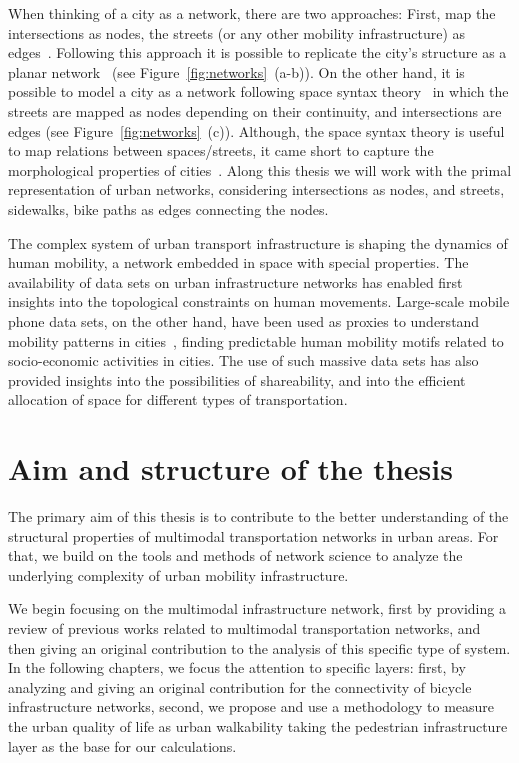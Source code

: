 When thinking of a city as a network, there are two approaches: First, map the intersections as nodes, the streets (or any other mobility infrastructure) as edges~\cite{porta2006primal}. Following this approach it is possible to replicate the city's structure as a planar network~\cite{Boeing2020Planarity} (see Figure~\ref{fig:networks}~(a-b)). On the other hand, it is possible to model a city as a network following space syntax theory~\cite{hillier1976syntax} in which the streets are mapped as nodes depending on their continuity, and intersections are edges (see Figure~\ref{fig:networks}~(c)). Although, the space syntax theory is useful to map relations between spaces/streets, it came short to capture the morphological properties of cities~\cite{batty2004new}. Along this thesis we will work with the primal representation of urban networks, considering intersections as nodes, and streets, sidewalks, bike paths as edges connecting the nodes.


The complex system of urban transport infrastructure is shaping the dynamics of human mobility, a network embedded in space with special properties. The availability of data sets on urban infrastructure networks has enabled first insights into the topological constraints on human movements. Large-scale mobile phone data sets, on the other hand, have been used as proxies to understand mobility patterns in cities~\cite{gonzalez2008understanding}, finding predictable human mobility motifs related to socio-economic activities in cities. The use of such massive data sets has also provided insights into the possibilities of shareability, and into the efficient allocation of space for different types of transportation.


\section{Aim and structure of the thesis}

The primary aim of this thesis is to contribute to the better understanding of the structural properties of multimodal transportation networks in urban areas. For that, we build on the tools and methods of network science to analyze the underlying complexity of urban mobility infrastructure. 

We begin focusing on the multimodal infrastructure network, first by providing a review of previous works related to multimodal transportation networks, and then giving an original contribution to the analysis of this specific type of system. In the following chapters, we focus the attention to specific layers: first, by analyzing and giving an original contribution for the connectivity of bicycle infrastructure networks, second, we propose and use a methodology to measure the urban quality of life as urban walkability taking the pedestrian infrastructure layer as the base for our calculations.


